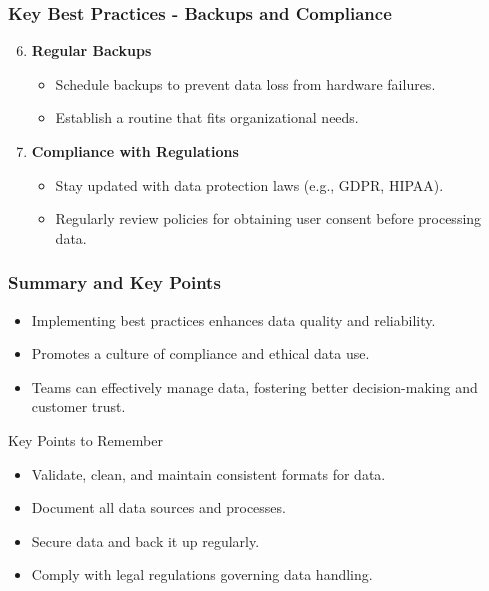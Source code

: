 \documentclass[aspectratio=169]{beamer}
\begin{document}
\begin{frame}
    \frametitle{Key Best Practices - Backups and Compliance}
    \begin{enumerate}
        \setcounter{enumi}{5}
        \item \textbf{Regular Backups}
        \begin{itemize}
            \item Schedule backups to prevent data loss from hardware failures.
            \item Establish a routine that fits organizational needs.
        \end{itemize}

        \item \textbf{Compliance with Regulations}
        \begin{itemize}
            \item Stay updated with data protection laws (e.g., GDPR, HIPAA).
            \item Regularly review policies for obtaining user consent before processing data.
        \end{itemize}
    \end{enumerate}
\end{frame}

\begin{frame}
    \frametitle{Summary and Key Points}
    \begin{itemize}
        \item Implementing best practices enhances data quality and reliability.
        \item Promotes a culture of compliance and ethical data use.
        \item Teams can effectively manage data, fostering better decision-making and customer trust.
    \end{itemize}
    
    \begin{block}{Key Points to Remember}
        \begin{itemize}
            \item Validate, clean, and maintain consistent formats for data.
            \item Document all data sources and processes.
            \item Secure data and back it up regularly.
            \item Comply with legal regulations governing data handling.
        \end{itemize}
    \end{block}
\end{frame}
\end{document}
